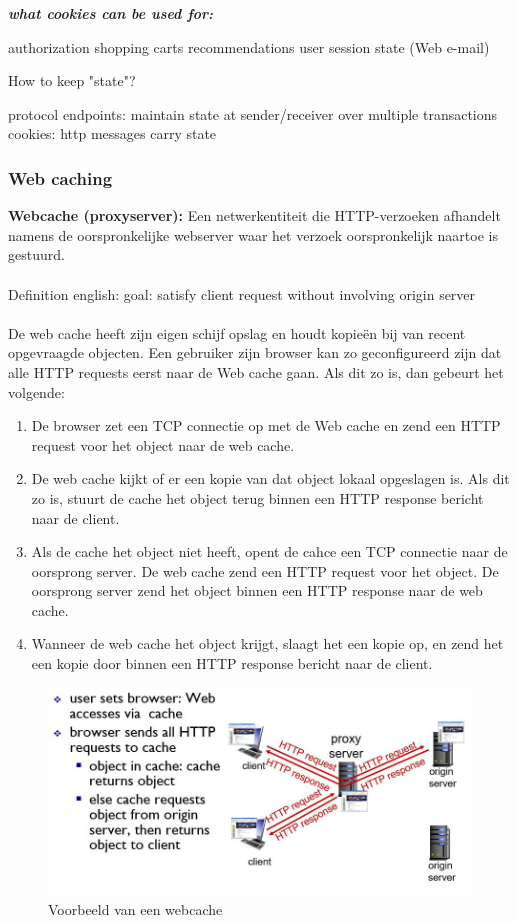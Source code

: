 \textit{\textbf{what cookies can be used for:}}

\bi
\itf authorization
\itf shopping carts
\itf recommendations
\itf user session state (Web e-mail)
\ei

How to keep "state"?

\bi
\itf protocol endpoints: maintain state at sender/receiver over multiple transactions
\itf cookies: http messages carry state
\ei

\clearpage

\subsubsection{Web caching}

\textbf{Webcache (proxyserver):} Een netwerkentiteit die HTTP-verzoeken afhandelt namens de oorspronkelijke webserver waar het verzoek oorspronkelijk naartoe is gestuurd.\\\\

Definition english: goal: satisfy client request without involving origin server\\\\

De web cache heeft zijn eigen schijf opslag en houdt kopieën bij van recent opgevraagde objecten. Een gebruiker zijn browser kan zo geconfigureerd zijn dat alle HTTP requests eerst naar de Web cache gaan. Als dit zo is, dan gebeurt het volgende:
\begin{enumerate}
    \item De browser zet een TCP connectie op met de Web cache en zend een HTTP request voor het object naar de web cache.
\item De web cache kijkt of er een kopie van dat object lokaal opgeslagen is. Als dit zo is, stuurt de cache het object terug binnen een HTTP response bericht naar de client.
\item Als de cache het object niet heeft, opent de cahce een TCP connectie naar de oorsprong server. De web cache zend een HTTP request voor het object. De oorsprong server zend het object binnen een HTTP response naar de web cache.
\item Wanneer de web cache het object krijgt, slaagt het een kopie op, en zend het een kopie door binnen een HTTP response bericht naar de client.
\end{enumerate}

\begin{figure}[h]
\centering
\includegraphics[width=4.5in]{./img/imghfdst2/webcache.jpg}
\caption{Voorbeeld van een webcache }
\label{fig:webcache}
\end{figure}

